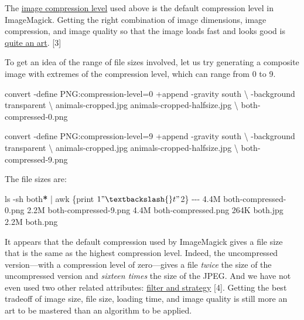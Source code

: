\documentclass[
  11pt,
  british,
  a4paper,
]{article}
\newenvironment{Shaded}{\begin{snugshade}}{\end{snugshade}}
\newcommand{\AttributeTok}[1]{\textcolor[rgb]{0.80,0.80,0.80}{#1}}
\newcommand{\DataTypeTok}[1]{\textcolor[rgb]{0.87,0.87,0.75}{#1}}
\newcommand{\ExtensionTok}[1]{\textcolor[rgb]{0.80,0.80,0.80}{#1}}
\newcommand{\FunctionTok}[1]{\textcolor[rgb]{0.94,0.94,0.56}{#1}}
\newcommand{\KeywordTok}[1]{\textcolor[rgb]{0.94,0.87,0.69}{#1}}
\newcommand{\NormalTok}[1]{\textcolor[rgb]{0.80,0.80,0.80}{#1}}
\newcommand{\PreprocessorTok}[1]{\textcolor[rgb]{1.00,0.81,0.69}{\textbf{#1}}}
\newcommand{\StringTok}[1]{\textcolor[rgb]{0.80,0.58,0.58}{#1}}
\begin{document}
The \href{https://en.wikipedia.org/wiki/Image_compression}{image
compression level} used above is the default compression level in
ImageMagick. Getting the right combination of image dimensions, image
compression, and image quality so that the image loads fast and looks
good is
\href{https://www.smashingmagazine.com/2015/06/efficient-image-resizing-with-imagemagick/}{quite
an art}. {[}3{]}

To get an idea of the range of file sizes involved, let us try
generating a composite image with extremes of the compression level,
which can range from 0 to 9.

\begin{Shaded}
\begin{Highlighting}[]
\ExtensionTok{convert} \AttributeTok{{-}define}\NormalTok{ PNG:compression{-}level=0 +append }\AttributeTok{{-}gravity}\NormalTok{ south }\DataTypeTok{\textbackslash{}}
\NormalTok{{-}background transparent }\DataTypeTok{\textbackslash{}}
\NormalTok{animals{-}cropped.jpg animals{-}cropped{-}halfsize.jpg }\DataTypeTok{\textbackslash{}}
\NormalTok{both{-}compressed{-}0.png}

\ExtensionTok{convert} \AttributeTok{{-}define}\NormalTok{ PNG:compression{-}level=9 +append }\AttributeTok{{-}gravity}\NormalTok{ south }\DataTypeTok{\textbackslash{}}
\NormalTok{{-}background transparent }\DataTypeTok{\textbackslash{}}
\NormalTok{animals{-}cropped.jpg animals{-}cropped{-}halfsize.jpg }\DataTypeTok{\textbackslash{}}
\NormalTok{both{-}compressed{-}9.png}
\end{Highlighting}
\end{Shaded}

The file sizes are:

\begin{Shaded}
\begin{Highlighting}[]
\FunctionTok{ls} \AttributeTok{{-}sh}\NormalTok{ both}\PreprocessorTok{*} \KeywordTok{|} \FunctionTok{awk} \StringTok{\textquotesingle{}\{print $1 "\textbackslash{}t" $2\}\textquotesingle{}}
\ExtensionTok{{-}{-}{-}}
\ExtensionTok{4.4M}\NormalTok{    both{-}compressed{-}0.png}
\ExtensionTok{2.2M}\NormalTok{    both{-}compressed{-}9.png}
\ExtensionTok{4.4M}\NormalTok{    both{-}compressed.png}
\ExtensionTok{264K}\NormalTok{    both.jpg}
\ExtensionTok{2.2M}\NormalTok{    both.png}
\end{Highlighting}
\end{Shaded}

It appears that the default compression used by ImageMagick gives a file
size that is the same as the highest compression level. Indeed, the
uncompressed version---with a compression level of zero---gives a file
\emph{twice} the size of the uncompressed version and \emph{sixteen
times} the size of the JPEG. And we have not even used two other related
attributes:
\href{https://stackoverflow.com/questions/27267073/imagemagick-lossless-max-compression-for-png}{filter
and strategy} {[}4{]}. Getting the best tradeoff of image size, file
size, loading time, and image quality is still more an art to be
mastered than an algorithm to be applied.
\end{document}
